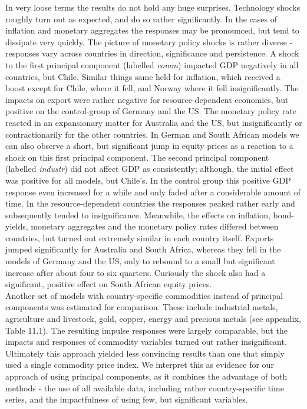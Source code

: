 \documentclass[12pt,]{article}
\begin{document}
In very loose terms the results do not hold any huge surprises.
Technology shocks roughly turn out as expected, and do so rather
significantly. In the cases of inflation and monetary aggregates the
responses may be pronounced, but tend to dissipate very quickly. The
picture of monetary policy shocks is rather diverse - responses vary
across countries in direction, significance and persistence. A shock to
the first principal component (labelled \emph{comm}) impacted GDP
negatively in all countries, but Chile. Similar things same held for
inflation, which received a boost except for Chile, where it fell, and
Norway where it fell insignificantly. The impacts on export were rather
negative for resource-dependent economies, but positive on the
control-group of Germany and the US. The monetary policy rate reacted in
an expansionary matter for Australia and the US, but insignificantly or
contractionarily for the other countries. In German and South African
models we can also observe a short, but significant jump in equity
prices as a reaction to a shock on this first principal component. The
second principal component (labelled \emph{industr}) did not affect GDP
as consistently; although, the initial effect was positive for all
models, but Chile's. In the control group this positive GDP response
even increased for a while and only faded after a considerable amount of
time. In the resource-dependent countries the responses peaked rather
early and subsequently tended to insignificance. Meanwhile, the effects
on inflation, bond-yields, monetary aggregates and the monetary policy
rates differed between countries, but turned out extremely similar in
each country itself. Exports jumped significantly for Australia and
South Africa, whereas they fell in the models of Germany and the US,
only to rebound to a small but significant increase after about four to
six quarters. Curiously the shock also had a significant, positive
effect on South African equity prices.\\
Another set of models with country-specific commodities instead of
principal components was estimated for comparison. These include
industrial metals, agriculture and livestock, gold, copper, energy and
precious metals (see appendix, Table 11.1). The resulting impulse
responses were largely comparable, but the impacts and responses of
commodity variables turned out rather insignificant. Ultimately this
approach yielded less convincing results than one that simply used a
single commodity price index. We interpret this as evidence for our
approach of using principal components, as it combines the advantage of
both methods - the use of all available data, including rather
country-specific time series, and the impactfulness of using few, but
significant variables.
\end{document}
